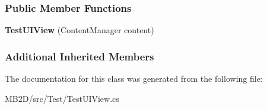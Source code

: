 \subsubsection*{Public Member Functions}
\begin{DoxyCompactItemize}
\item 
\hypertarget{class_m_b2_d_1_1_testing_1_1_test_u_i_view_a824c843e55949ace7e7b97179b4edb81}{}\label{class_m_b2_d_1_1_testing_1_1_test_u_i_view_a824c843e55949ace7e7b97179b4edb81} 
{\bfseries Test\+U\+I\+View} (Content\+Manager content)
\end{DoxyCompactItemize}
\subsubsection*{Additional Inherited Members}


The documentation for this class was generated from the following file\+:\begin{DoxyCompactItemize}
\item 
M\+B2\+D/src/\+Test/Test\+U\+I\+View.\+cs\end{DoxyCompactItemize}
